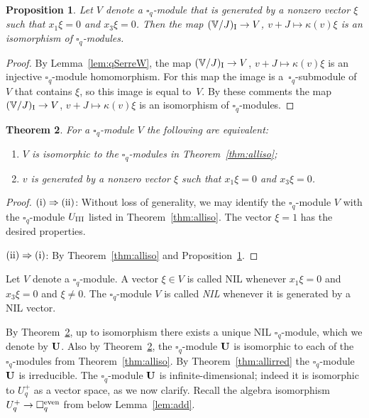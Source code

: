 \documentclass[pdftex]{sigma}
\numberwithin{equation}{section}
\newtheorem{Theorem}{Theorem}[section]
\newtheorem{Proposition}[Theorem]{Proposition}
 { \theoremstyle{definition}
\newtheorem{Definition}[Theorem]{Definition}
\newtheorem{Example}[Theorem]{Example}
\newtheorem{Note}[Theorem]{Note}
}
\begin{document}
\begin{Proposition}\label{prop:bij} Let $V$ denote a $\square_q$-module that is generated by a nonzero vector $\xi$ such that $x_1 \xi = 0 $ and $x_3 \xi = 0$. Then the map $(\mathbb V/J)_{\rm I} \to V$, $v+J \mapsto \kappa(v)\xi$ is an isomorphism of $\square_q$-modules.
\end{Proposition}
\begin{proof}By Lemma~\ref{lem:qSerreW}, the map $(\mathbb V/J)_{\rm I} \to V$, $v+J \mapsto \kappa(v)\xi$
is an injective $\square_q$-module homomorphism. For this map the image is a~$\square_q$-submodule of $V$ that contains $\xi$, so this image is equal to~$V$. By these comments the map $(\mathbb V/J)_{\rm I} \to V$, $v+J \mapsto \kappa(v)\xi$ is an isomorphism of $\square_q$-modules.
\end{proof}

\begin{Theorem}\label{thm:Uchar} For a $\square_q$-module $V$ the following are equivalent:
\begin{enumerate}\itemsep=0pt
\item[\rm (i)] $V$ is isomorphic to the $\square_q$-modules in Theorem~{\rm \ref{thm:alliso}};
\item[\rm (ii)] $v$ is generated by a nonzero vector $\xi$ such that $x_1 \xi = 0 $ and $x_3 \xi = 0$.
\end{enumerate}
\end{Theorem}
\begin{proof}${\rm (i)} \Rightarrow {\rm (ii)}$: Without loss of generality, we may identify the $\square_q$-module $V$ with the $\square_q$-module $U_{\rm III}$ listed in Theorem~\ref{thm:alliso}.
The vector $\xi=1$ has the desired properties.

${\rm (ii)} \Rightarrow {\rm (i)}$: By Theorem~\ref{thm:alliso} and Proposition~\ref{prop:bij}.
\end{proof}

\begin{Definition}Let $V$ denote a $\square_q$-module. A vector $\xi \in V$ is called {\rm NIL} whenever
$x_1 \xi = 0$ and $x_3 \xi = 0$ and $\xi \not= 0$. The $\square_q$-module $V$ is called {\it NIL} whenever it is generated by a NIL vector.
\end{Definition}

By Theorem~\ref{thm:Uchar}, up to isomorphism there exists a unique NIL $\square_q$-module, which we denote by $\bf U$. Also by Theorem~\ref{thm:Uchar}, the $\square_q$-module $\bf U$ is isomorphic to each of the
$\square_q$-modules from Theorem~\ref{thm:alliso}. By Theorem~\ref{thm:allirred} the $\square_q$-module $\bf U$ is irreducible. The $\square_q$-module $\bf U$ is infinite-dimensional; indeed it is isomorphic to $U^+_q$ as a vector space, as we now clarify. Recall the algebra isomorphism $U^+_q \to \square^{\rm even}_q$ from below Lemma~\ref{lem:add}.
\end{document}
